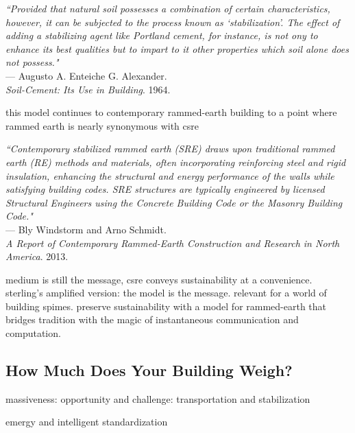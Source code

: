 \begin{flushright}
\small{
\textit{``Provided that natural soil possesses a combination of certain characteristics, however, it can be subjected to the process known as `stabilization'. The effect of adding a stabilizing agent like Portland cement, for instance, is not ony to enhance its best qualities but to impart to it other properties which soil alone does not possess."}}\\ --- Augusto A. Enteiche G.  Alexander. \\ \textit{Soil-Cement: Its Use in Building}. 1964.
\end{flushright}


this model continues to contemporary rammed-earth building to a point where rammed earth is nearly synonymous with csre


\begin{flushright}
\small{
\textit{
``Contemporary stabilized rammed earth (SRE) draws upon traditional rammed earth (RE) methods and materials, often incorporating reinforcing steel and rigid insulation, enhancing the structural and energy performance of the walls while satisfying building codes. SRE structures are typically engineered by licensed Structural Engineers using the Concrete Building Code or the Masonry Building Code."}} \\ --- Bly Windstorm and Arno Schmidt. \\ \textit{A Report of Contemporary Rammed-Earth Construction and Research in North America}. 2013.
\end{flushright}

medium is still the message, csre conveys sustainability at a convenience. sterling's amplified version: the model is the message. relevant for a world of building spimes. preserve sustainability with a model for rammed-earth that bridges tradition with the magic of instantaneous communication and computation.

\subsection{How Much Does Your Building Weigh?}

 massiveness: opportunity and challenge: transportation and stabilization

 emergy and intelligent standardization

